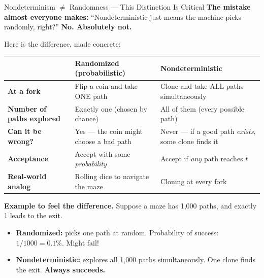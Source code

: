 \begin{conceptbox}{Nondeterminism $\neq$ Randomness --- This Distinction Is Critical}
\textbf{The mistake almost everyone makes:} ``Nondeterministic just means the
machine picks randomly, right?'' \textbf{No. Absolutely not.}

Here is the difference, made concrete:

\begin{center}
\renewcommand{\arraystretch}{1.4}
\begin{tabular}{p{4cm}p{5.5cm}p{5.5cm}}
\toprule
& \textbf{Randomized (probabilistic)} & \textbf{Nondeterministic} \\
\midrule
\textbf{At a fork} & Flip a coin and take ONE path &
  Clone and take ALL paths simultaneously \\
\textbf{Number of paths explored} & Exactly one (chosen by chance) &
  All of them (every possible path) \\
\textbf{Can it be wrong?} & Yes --- the coin might choose a bad path &
  Never --- if a good path \emph{exists}, some clone finds it \\
\textbf{Acceptance} & Accept with some \emph{probability} &
  Accept if \emph{any} path reaches $t$ \\
\textbf{Real-world analog} & Rolling dice to navigate the maze &
  Cloning at every fork \\
\bottomrule
\end{tabular}
\end{center}

\textbf{Example to feel the difference.} Suppose a maze has 1,000 paths, and
exactly 1 leads to the exit.
\begin{itemize}[nosep]
\item \textbf{Randomized:} picks one path at random. Probability of success:
  $1/1000 = 0.1\%$. Might fail!
\item \textbf{Nondeterministic:} explores all 1,000 paths simultaneously. One
  clone finds the exit. \textbf{Always succeeds.}
\end{itemize}

\end{conceptbox}

